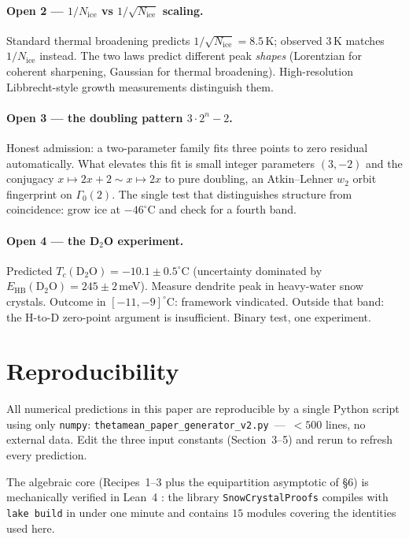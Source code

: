 \documentclass[final]{siamltex}
\newcommand{\EHB}{E_{\text{HB}}}
\newcommand{\Nrule}{N_{\text{ice}}}
\begin{document}
\paragraph{Open 2 --- $1/\Nrule$ vs $1/\sqrt{\Nrule}$ scaling.}
Standard thermal broadening predicts $1/\sqrt{\Nrule} = 8.5$\,K;
observed $3$\,K matches $1/\Nrule$ instead.  The two laws predict
different peak \emph{shapes} (Lorentzian for coherent sharpening,
Gaussian for thermal broadening).  High-resolution Libbrecht-style
growth measurements distinguish them.

\paragraph{Open 3 --- the doubling pattern $3 \cdot 2^n - 2$.}
Honest admission: a two-parameter family fits three points to
zero residual automatically.  What elevates this fit is small
integer parameters $(3, -2)$ and the conjugacy
$x \mapsto 2x + 2 \sim x \mapsto 2x$ to pure doubling, an Atkin--Lehner
$w_2$ orbit fingerprint on $\Gamma_0(2)$.  The single test that
distinguishes structure from coincidence: grow ice at
$-46^{\circ}$C and check for a fourth band.

\paragraph{Open 4 --- the D$_2$O experiment.}
Predicted $T_c(\text{D}_2\text{O}) = -10.1 \pm 0.5^{\circ}$C
(uncertainty dominated by $\EHB(\text{D}_2\text{O}) = 245 \pm
2$\,meV).  Measure dendrite peak in heavy-water snow crystals.
Outcome in $[-11, -9]^{\circ}$C: framework vindicated.
Outside that band: the H-to-D zero-point argument is
insufficient.  Binary test, one experiment.

\section{Reproducibility}

All numerical predictions in this paper are reproducible by a
single Python script using only \texttt{numpy}:
\texttt{thetamean\_paper\_generator\_v2.py}~---~$<\!500$ lines,
no external data.  Edit the three input constants (Section~3--5)
and rerun to refresh every prediction.

The algebraic core (Recipes~1--3 plus the equipartition
asymptotic of \S6) is mechanically verified in Lean~4
\cite{MamounLeanLib}: the library
\texttt{SnowCrystalProofs} compiles with \texttt{lake build} in
under one minute and contains $15$ modules covering the
identities used here.
\end{document}
